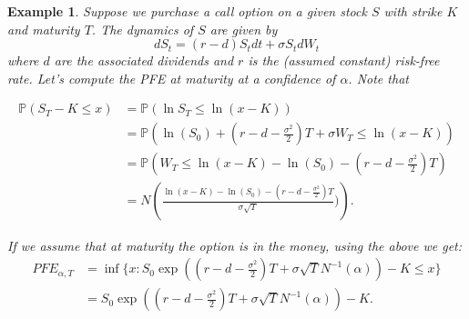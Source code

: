 \documentclass[]{article}
\newcommand{\PP}{{\mathbb P}}
\newtheorem{example}{Example}[section]
\begin{document}
\begin{example}
	Suppose we purchase a call option on a given stock $S$ with strike $K$ and maturity $T$. The dynamics of $S$ are given by
	\[
	dS_t = (r-d)S_tdt + \sigma S_t dW_t
	\]
	where $d$ are the associated dividends and $r$ is the (assumed constant) risk-free rate. Let's compute the PFE at maturity at a confidence of $\alpha$. Note that
	
	\begin{align*}
		\PP (S_T - K \leq x) &=  \PP ( \ln S_T \leq \ln(x-K) )\\
		 &= \PP \left( \ln(S_0) + (r-d-\frac{\sigma^2}{2})T + \sigma W_T \leq \ln(x -K) \right) \\
		 &= \PP \left( W_T \leq \ln(x-K) - \ln(S_0) - (r-d-\frac{\sigma^2}{2})T \right) \\
		 &= N \left( \frac{\ln(x-K) - \ln(S_0) - (r-d-\frac{\sigma^2}{2})T}{\sigma \sqrt T}) \right).
	\end{align*}
	
	If we assume that at maturity the option is in the money, using the above we get:
	\begin{align*}
	PFE_{\alpha, T} &= \inf \{ x : S_0 \exp \left( (r-d-\frac{\sigma^2}{2})T + \sigma \sqrt T N^{-1}(\alpha) \right) - K \leq x \} \\
	&= S_0 \exp \left( (r-d-\frac{\sigma^2}{2})T + \sigma \sqrt T N^{-1}(\alpha) \right) - K .
	\end{align*}
\end{example}
\end{document}
